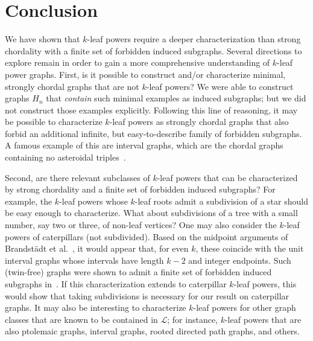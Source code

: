 \documentclass[11pt,letter]{article}
\newcommand{\ml}[1]{{\color{blue}{#1}}}
\theoremstyle{remark}
\renewcommand{\L}{\mathcal{L}}
\begin{document}
\section{Conclusion}
We have shown that $k$-leaf powers require a deeper characterization than strong chordality with a finite set of forbidden induced subgraphs. Several directions  to explore remain in order to gain a more comprehensive understanding of $k$-leaf power graphs.
First, is it possible to construct and/or characterize minimal, strongly chordal graphs that are not $k$-leaf powers?  We were able to construct graphs $H_n$ that \emph{contain} such minimal examples as induced subgraphs; but we did not construct those examples explicitly.
Following this line of reasoning, it may be possible to characterize $k$-leaf powers as strongly chordal graphs that also forbid an additional infinite, but easy-to-describe family of forbidden subgraphs. A famous example of this are interval graphs, which are the chordal graphs containing no asteroidal triples~\cite{LB62}.

Second, are there relevant subclasses of $k$-leaf powers that can be characterized by strong chordality and a finite set of forbidden induced subgraphs?  For example, the $k$-leaf powers whose $k$-leaf roots admit a subdivision of a star should be easy enough to characterize. What about subdivisions of a tree with a small number, say two or three, of non-leaf vertices?   
One may also consider the $k$-leaf powers of caterpillars (not subdivided). Based on the midpoint arguments of Brandstädt et al.~\cite[Theorem 6]{BRANDSTADT2010897}, it would appear that, for even $k$, these coincide with the unit interval graphs whose intervals have length $k-2$ and integer endpoints.  Such (twin-free) graphs were shown to admit a finite set of forbidden induced subgraphs in~\cite{duran2015unit}. If this characterization extends to caterpillar $k$-leaf powers, this would show that taking subdivisions is necessary for our result on caterpillar graphs. 
It may also be interesting to characterize $k$-leaf powers for other graph classes that are known to be contained in $\L$; for instance, $k$-leaf powers that are also ptolemaic graphs, interval graphs, rooted directed path graphs, and others. 




 






\end{document}
